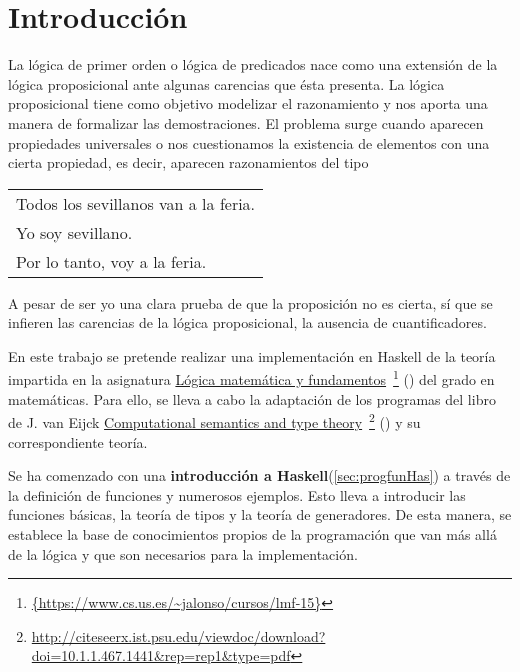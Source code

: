 \chapter*{Introducción}


La lógica de primer orden o lógica de predicados nace como una extensión de la
lógica proposicional ante algunas carencias que ésta presenta. La lógica
proposicional tiene como objetivo modelizar el razonamiento y nos aporta una
manera de formalizar las demostraciones. El problema surge cuando aparecen
propiedades universales o nos cuestionamos la existencia de elementos con una
cierta propiedad, es decir, aparecen razonamientos del tipo
\begin{center}
\begin{tabular}{l}
  Todos los sevillanos van a la feria. \\
  Yo soy sevillano.\\
  Por lo tanto, voy a la feria.
\end{tabular}
\end{center}
A pesar de ser yo una clara prueba de que la proposición no es cierta, sí que
se infieren las carencias de la lógica proposicional, la ausencia de cuantificadores.

\vspace{4mm}

En este trabajo se pretende realizar una implementación en Haskell de la teoría impartida en la asignatura
\href{https://www.cs.us.es/~jalonso/cursos/lmf-15}{Lógica matemática y fundamentos}\
\footnote{\url{{https://www.cs.us.es/~jalonso/cursos/lmf-15}}}
(\cite{Alonso-15a}) del grado en matemáticas.  Para ello, se lleva a cabo la adaptación de los programas del libro de
J. van Eijck 
\href{http://citeseerx.ist.psu.edu/viewdoc/download?doi=10.1.1.467.1441&rep=rep1&type=pdf}
{Computational semantics and type theory}\
\footnote{\url{http://citeseerx.ist.psu.edu/viewdoc/download?doi=10.1.1.467.1441&rep=rep1&type=pdf}}
(\cite{Eijck-03}) y su correspondiente teoría. 

\vspace{3mm}

Se ha comenzado con una \textbf{introducción a Haskell}(\ref{sec:progfunHas}) a través de
la definición de funciones y numerosos ejemplos. Esto lleva a introducir las
funciones básicas, la teoría de tipos y la teoría de generadores. De esta manera,
se establece la base de conocimientos propios de la programación que van  más allá de la lógica y que son necesarios para la implementación.

